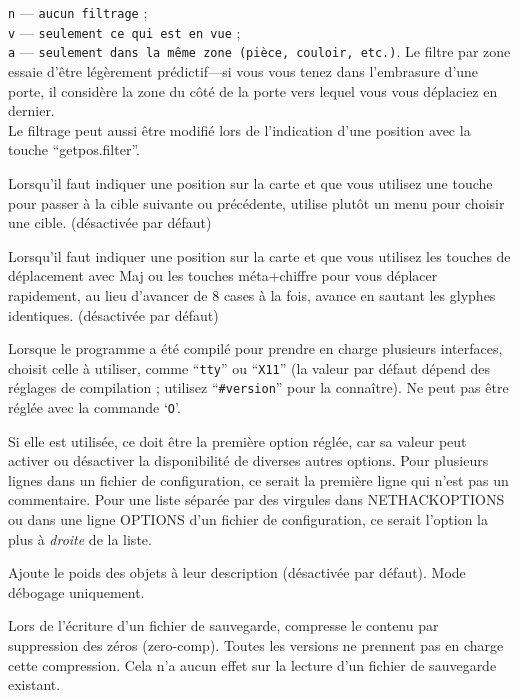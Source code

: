 \documentclass[titlepage]{article}
\begin{document}
\begin{description}[font=\mdseries\itshape]
\texttt{n} --- \texttt{aucun filtrage} ;\\
\texttt{v} --- \texttt{seulement ce qui est en vue} ;\\
\texttt{a} --- \texttt{seulement dans la même zone (pièce, couloir, etc.)}.
Le filtre par zone essaie d'être légèrement
prédictif---si
vous vous tenez dans l'embrasure d'une porte, il considère la zone du côté
de la porte vers lequel vous vous déplaciez en dernier.\\
Le filtrage peut aussi être modifié lors de l'indication d'une position avec
la touche ``getpos.filter''.
\item[whatis\textunderscore menu]
Lorsqu'il faut indiquer une position sur la carte et que vous utilisez une touche pour
passer à la cible suivante ou précédente, utilise plutôt un menu pour choisir une cible.
(désactivée par défaut)
\item[whatis\textunderscore moveskip]
Lorsqu'il faut indiquer une position sur la carte et que vous utilisez les touches de déplacement
avec Maj ou les touches méta+chiffre pour vous déplacer rapidement, au lieu d'avancer de 8 cases à la fois,
avance en sautant les glyphes identiques.
(désactivée par défaut)
\item[windowtype]
Lorsque le programme a été compilé pour prendre en charge plusieurs interfaces,
choisit celle à utiliser, comme ``\texttt{tty}'' ou ``\texttt{X11}''
(la valeur par défaut dépend des réglages de compilation ; utilisez ``\texttt{\#version}'' pour la connaître).
Ne peut pas être réglée avec la commande `\texttt{O}'.

Si elle est utilisée, ce doit être la première option réglée, car sa valeur peut
activer ou désactiver la disponibilité de diverses autres options.
Pour plusieurs lignes dans un fichier de configuration, ce serait la première
ligne qui n'est pas un commentaire.
Pour une liste séparée par des virgules dans NETHACKOPTIONS ou dans une ligne OPTIONS d'un
fichier de configuration, ce serait l'option la plus à \textit{droite} de la liste.
\item[wizweight]
Ajoute le poids des objets à leur description (désactivée par défaut).
Mode débogage uniquement.
\item[zerocomp]
Lors de l'écriture d'un fichier de sauvegarde, compresse le contenu par
suppression des zéros (zero-comp). Toutes les versions ne prennent pas en charge cette compression.
Cela n'a aucun effet sur la lecture d'un fichier de sauvegarde existant.
\end{description}
\end{document}
